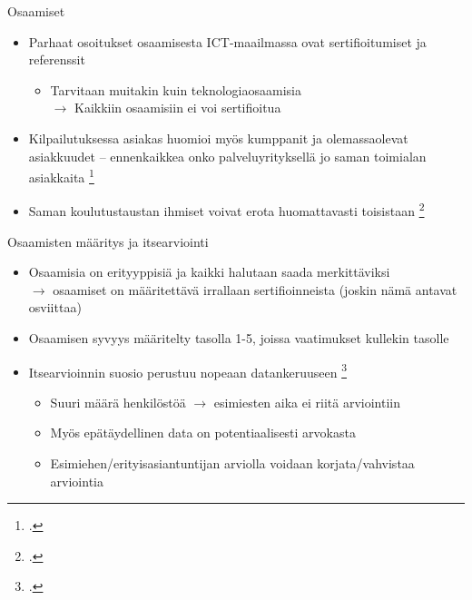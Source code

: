 \documentclass[first=purple,second=dblue,logo=redquo]{aaltoslides}
\begin{document}
\begin{frame}{Osaamiset}
\begin{itemize}
\item Parhaat osoitukset osaamisesta ICT-maailmassa ovat sertifioitumiset ja referenssit
\begin{itemize}
\item Tarvitaan muitakin kuin teknologiaosaamisia \\ $\rightarrow$ Kaikkiin osaamisiin ei voi sertifioitua
\end{itemize}
\item Kilpailutuksessa asiakas huomioi myös kumppanit ja olemassaolevat asiakkuudet -- ennenkaikkea onko palveluyrityksellä jo saman toimialan asiakkaita \footcite{ICT-haasteet}
\item Saman koulutustaustan ihmiset voivat erota huomattavasti toisistaan \footcite{self-assessment_in_skill_measurement}
\end{itemize}
\end{frame}
\begin{frame}{Osaamisten määritys ja itsearviointi}
\begin{itemize}
\item Osaamisia on erityyppisiä ja kaikki halutaan saada merkittäviksi \\ $\rightarrow$ osaamiset on määritettävä irrallaan sertifioinneista (joskin nämä antavat osviittaa)
\item Osaamisen syvyys määritelty tasolla 1-5, joissa vaatimukset kullekin tasolle
\item Itsearvioinnin suosio perustuu nopeaan datankeruuseen \footcite{self-assessment_in_skill_measurement}
\begin{itemize}
\item Suuri määrä henkilöstöä $\rightarrow$ esimiesten aika ei riitä arviointiin
\item Myös epätäydellinen data on potentiaalisesti arvokasta
\item Esimiehen/erityisasiantuntijan arviolla voidaan korjata/vahvistaa arviointia
\end{itemize}
\end{itemize}
\end{frame}
\end{document}
